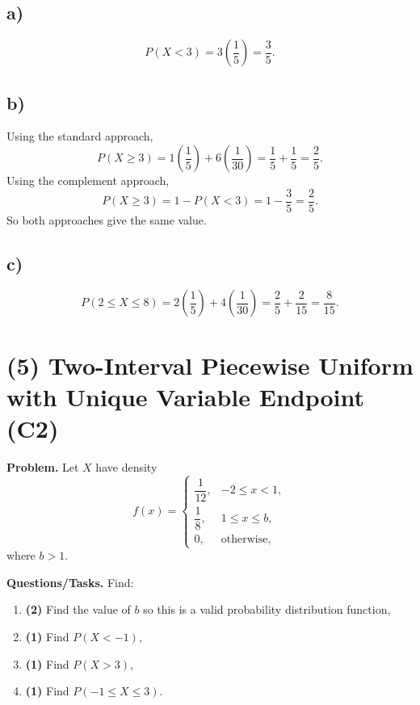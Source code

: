 
\subsection*{a)}
\[
P(X<3)=3\left(\frac{1}{5}\right)=\frac{3}{5}.
\]


\subsection*{b)}
Using the standard approach,
\[
P(X\ge 3)=1\left(\frac{1}{5}\right)+6\left(\frac{1}{30}\right)=\frac{1}{5}+\frac{1}{5}=\frac{2}{5}.
\]
Using the complement approach,
\[
P(X\ge 3)=1-P(X<3)=1-\frac{3}{5}=\frac{2}{5}.
\]
So both approaches give the same value.


\subsection*{c)}
\[
P(2\le X\le 8)=2\left(\frac{1}{5}\right)+4\left(\frac{1}{30}\right)=\frac{2}{5}+\frac{2}{15}=\frac{8}{15}.
\]


\section{(5) Two-Interval Piecewise Uniform with Unique Variable Endpoint (C2)}

\textbf{Problem.}
Let $X$ have density
\[
f(x)=
\begin{cases}
	\dfrac{1}{12}, & -2\le x<1,\\[4pt]
	\dfrac{1}{8}, & 1\le x\le b,\\[4pt]
	0, & \text{otherwise,}
\end{cases}
\]
where $b>1$.

\textbf{Questions/Tasks.}
Find:
\begin{enumerate}[label=\textbf{\alph*)}]
	\item \textbf{(2)} Find the value of $b$ so this is a valid probability distribution function,
	\item \textbf{(1)} Find $P(X<-1)$,
	\item \textbf{(1)} Find $P(X>3)$,
	\item \textbf{(1)} Find $P(-1\le X\le 3)$.
\end{enumerate}

